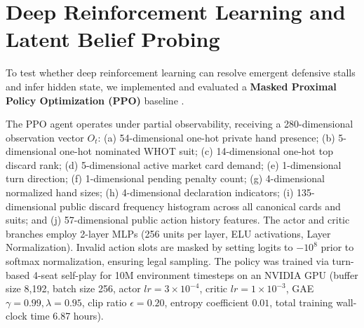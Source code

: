 \documentclass[journal]{IEEEtran}
\begin{document}
\begin{table}[t]
\centering
\caption{Benchmark Evaluation Matrix for Trained Masked PPO ($N = 2{,}000$ Independent Test Games)}
\label{tab:ppo_evaluation_matrix}
\small
{}
\end{table}

\section{Deep Reinforcement Learning and Latent Belief Probing}
To test whether deep reinforcement learning can resolve emergent defensive stalls and infer hidden state, we implemented and evaluated a \textbf{Masked Proximal Policy Optimization (PPO)} baseline \cite{schulman2017proximal}.

The PPO agent operates under partial observability, receiving a 280-dimensional observation vector $O_t$: (a) 54-dimensional one-hot private hand presence; (b) 5-dimensional one-hot nominated WHOT suit; (c) 14-dimensional one-hot top discard rank; (d) 5-dimensional active market card demand; (e) 1-dimensional turn direction; (f) 1-dimensional pending penalty count; (g) 4-dimensional normalized hand sizes; (h) 4-dimensional declaration indicators; (i) 135-dimensional public discard frequency histogram across all canonical cards and suits; and (j) 57-dimensional public action history features. The actor and critic branches employ 2-layer MLPs (256 units per layer, ELU activations, Layer Normalization). Invalid action slots are masked by setting logits to $-10^8$ prior to softmax normalization, ensuring legal sampling. The policy was trained via turn-based 4-seat self-play for 10M environment timesteps on an NVIDIA GPU (buffer size 8,192, batch size 256, actor $lr = 3 \times 10^{-4}$, critic $lr = 1 \times 10^{-3}$, GAE $\gamma = 0.99, \lambda = 0.95$, clip ratio $\epsilon = 0.20$, entropy coefficient $0.01$, total training wall-clock time 6.87 hours).
\end{document}
